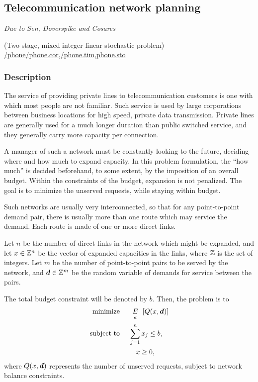 \subsection{Telecommunication network planning}%
\emph{Due to Sen, Doverspike and Cosares \cite{sen94}}%

\noindent(Two stage, mixed integer linear stochastic problem)\\
\noindent\url{/phone}\url{/phone.cor},\url{/phone.tim},\url{phone.sto}

\vspace{3mm}
\subsubsection{Description}
The service of providing private lines to telecommunication customers is one with which most people are not familiar.  Such service is used by large corporations between business locations for high speed, private data transmission.  Private lines are generally used for a much longer duration than public switched service, and they generally carry more capacity per connection.

A manager of such a network must be constantly looking to the future, deciding where and how much to expand capacity.  In this problem formulation, the ``how much'' is decided beforehand, to some extent, by the imposition of an overall budget.  Within the constraints of the budget, expansion is not penalized.  The goal is to minimize the unserved requests, while staying within budget.

Such networks are usually very interconnected, so that for any point-to-point demand pair, there is usually more than one route which may service the demand.  Each route is made of one or more direct links.

Let $n$ be the number of direct links in the network which might be expanded, and let $x \in {\mathbb Z}^n$ be the vector of expanded capacities in the links, where ${\mathbb Z}$ is the set of integers.  Let $m$ be the number of point-to-point pairs to be served by the network, and $\mathbf{\boldsymbol{d}} \in {\mathbb Z}^m$ be the random variable of demands for service between the pairs.

The total budget constraint will be denoted by $b$.  Then, the problem is to
\begin{align*}
\text{minimize }&\quad \expect[d] \left[ Q(x,\rand{d})\right]\\
\text{subject to }&\quad \sum_{j=1}^n x_j \leq b,\\
&\qquad x \geq 0,
\end{align*}
where $Q(x, \mathbf{\boldsymbol{d}})$ represents the number of unserved requests, subject to network balance constraints.

